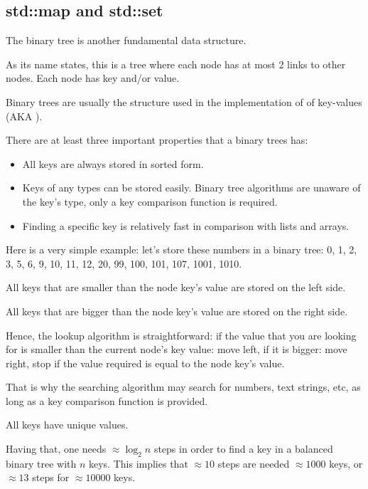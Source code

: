 \subsection{std::map and std::set}

The binary tree is another fundamental data structure.

As its name states, this is a tree where each node has at most 2 links to other nodes.
Each node has key and/or value.

Binary trees are usually the structure used in the implementation of  of key-values (\ac{AKA} ).

There are at least three important properties that a binary trees has:
\begin{itemize}
\item All keys are always stored in sorted form.
\item Keys of any types can be stored easily.
Binary tree algorithms are unaware of the key's type, 
only a key comparison function is required.
\item 
Finding a specific key is relatively fast in comparison with lists and arrays.
\end{itemize}

Here is a very simple example: let's store these numbers in a binary tree:
0, 1, 2, 3, 5, 6, 9, 10, 11, 12, 20, 99, 100, 101, 107, 1001, 1010.



All keys that are smaller than the node key's value are stored on the left side.

All keys that are bigger than the node key's value are stored on the right side.

Hence, the lookup algorithm is straightforward: if the value that you are looking for is smaller than the current node's key value:
move left, if it is bigger: move right, stop if the value required is equal to the node key's value.

That is why the searching algorithm may search for numbers, text strings, etc, as long as 
a key comparison function is provided.

All keys have unique values.

Having that, one needs $\approx \log_{2} n$ steps in order to find a key in a balanced binary tree with $n$ keys.
This implies that $\approx 10$ steps are needed $\approx 1000$ keys, or $\approx 13$ 
steps for $\approx 10000$ keys.

